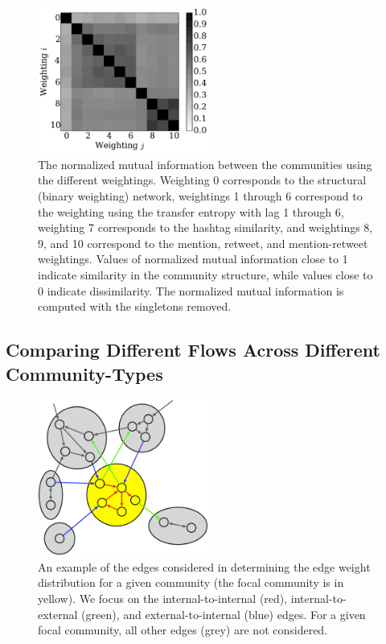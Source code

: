 \begin{figure}[h!]
  \centering
\includegraphics[width=0.50\textwidth]{figures/nmi_singletons.pdf}
\caption{The normalized mutual information between the communities using the different weightings. Weighting 0 corresponds to the structural (binary weighting) network, weightings 1 through 6 correspond to the weighting using the transfer entropy with lag 1 through 6, weighting 7 corresponds to the hashtag similarity, and weightings 8, 9, and 10 correspond to the mention, retweet, and mention-retweet weightings. Values of normalized mutual information close to 1 indicate similarity in the community structure, while values close to 0 indicate dissimilarity. The normalized mutual information is computed with the singletons removed.}
\label{Fig-compare_coverings}
\end{figure}

\subsection{Comparing Different Flows Across Different Community-Types}

\begin{figure}[h!]
  \centering
\includegraphics[width=0.50\textwidth]{figures/edge-types.eps}
\caption{An example of the edges considered in determining the edge weight distribution for a given community (the focal community is in yellow). We focus on the internal-to-internal (red), internal-to-external (green), and external-to-internal (blue) edges. For a given focal community, all other edges (grey) are not considered.}
\label{Fig-edge_types}
\end{figure}